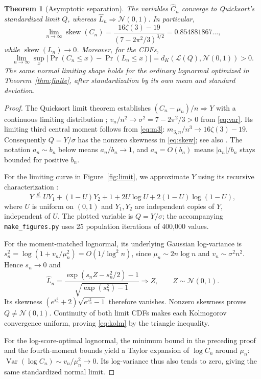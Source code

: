 \documentclass[10pt,letterpaper]{article}
\newtheorem{theorem}{Theorem}
\newcommand{\Var}{\operatorname{Var}}
\newcommand{\Law}{\mathcal L}
\newcommand{\norm}{\mathcal N}
\begin{document}
\begin{theorem}[Asymptotic separation]\label{thm:limit}
The variables $\widehat C_n$ converge to Quicksort's standardized limit $Q$, whereas $\widehat L_n\Rightarrow\norm(0,1)$. In particular,
\begin{equation}
\lim_{n\to\infty}\operatorname{skew}(C_n)
=\frac{16\zeta(3)-19}{(7-2\pi^2/3)^{3/2}}
=0.854881867\ldots,                                    \label{eq:skew}
\end{equation}
while $\operatorname{skew}(L_n)\to0$. Moreover, for the CDFs,
\begin{equation}
\lim_{n\to\infty}\sup_x
\bigl|\Pr(C_n\le x)-\Pr(L_n\le x)\bigr|
=d_K(\Law(Q),\norm(0,1))>0.                                \label{eq:kolm}
\end{equation}
The same normal limiting shape holds for the ordinary lognormal optimized in Theorem~\ref{thm:finite}, after standardization by its own mean and standard deviation.
\end{theorem}
\begin{proof}
The Quicksort limit theorem establishes $(C_n-\mu_n)/n\Rightarrow Y$ with a continuous limiting distribution \cite{rosler,filljanson}; $v_n/n^2\to\sigma^2=7-2\pi^2/3>0$ from \eqref{eq:var}. Its limiting third central moment follows from \eqref{eq:m3}: $m_{3,n}/n^3\to16\zeta(3)-19$. Consequently $Q=Y/\sigma$ has the nonzero skewness in \eqref{eq:skew}; see also \cite{yao}. The notation $a_n\sim b_n$ below means $a_n/b_n\to1$, and $a_n=O(b_n)$ means $|a_n|/b_n$ stays bounded for positive $b_n$.

For the limiting curve in Figure~\ref{fig:limit}, we approximate $Y$ using its recursive characterization \cite{rosler}:
\[
Y\overset d= UY_1+(1-U)Y_2+1+2U\log U+2(1-U)\log(1-U),
\]
where $U$ is uniform on $(0,1)$ and $Y_1,Y_2$ are independent copies of $Y$, independent of $U$. The plotted variable is $Q=Y/\sigma$; the accompanying \texttt{make\_figures.py} uses 25 population iterations of 400,000 values.

For the moment-matched lognormal, its underlying Gaussian log-variance is
$s_n^2=\log(1+v_n/\mu_n^2)=O(1/\log^2 n)$, since $\mu_n\sim2n\log n$ and $v_n\sim\sigma^2n^2$. Hence $s_n\to0$ and
\[\widehat L_n=\frac{\exp(s_nZ-s_n^2/2)-1}{\sqrt{\exp(s_n^2)-1}}
\Rightarrow Z,\qquad Z\sim\norm(0,1).\]
Its skewness $(e^{s_n^2}+2)\sqrt{e^{s_n^2}-1}$ therefore vanishes. Nonzero skewness proves $Q\ne\norm(0,1)$. Continuity of both limit CDFs makes each Kolmogorov convergence uniform, proving \eqref{eq:kolm} by the triangle inequality.

For the log-score-optimal lognormal, the minimum bound in the preceding proof and the fourth-moment bounds yield a Taylor expansion of $\log C_n$ around $\mu_n$: $\Var(\log C_n)\sim v_n/\mu_n^2\to0$. Its log-variance thus also tends to zero, giving the same standardized normal limit.
\end{proof}
\end{document}
